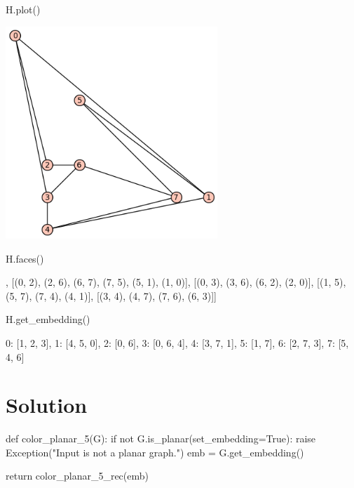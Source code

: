 \begin{sageCell}
    H.plot()
\end{sageCell}
\begin{outImage}
   \includegraphics[width=0.6\textwidth]{Images/5-coloring/planar_graph.png}
\end{outImage}

\begin{sageCell}
    H.faces()
\end{sageCell}
\begin{outCell}
    [[(0, 1), (1, 4), (4, 3), (3, 0)],
     [(0, 2), (2, 6), (6, 7), (7, 5), (5, 1), (1, 0)],
     [(0, 3), (3, 6), (6, 2), (2, 0)],
     [(1, 5), (5, 7), (7, 4), (4, 1)],
     [(3, 4), (4, 7), (7, 6), (6, 3)]]
\end{outCell}

\begin{sageCell}
    H.get_embedding()
\end{sageCell}
\begin{outCell}
    {0: [1, 2, 3],
     1: [4, 5, 0],
     2: [0, 6],
     3: [0, 6, 4],
     4: [3, 7, 1],
     5: [1, 7],
     6: [2, 7, 3],
     7: [5, 4, 6]}
\end{outCell}

\section{Solution}

\begin{sageCell}
def color_planar_5(G):
    if not G.is_planar(set_embedding=True):
        raise Exception("Input is not a planar graph.")
    emb = G.get_embedding()

    return color_planar_5_rec(emb)
\end{sageCell}

